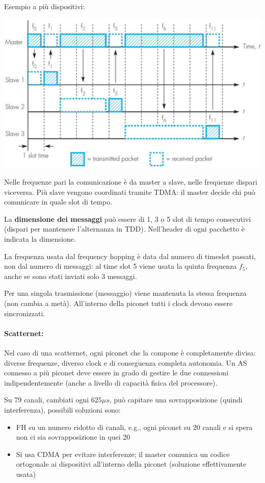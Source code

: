Esempio a più dispositivi: 
\begin{center}
	\includegraphics[width=0.9\linewidth]{img/wpan/picocomm2}
\end{center}

Nelle frequenze pari la comunicazione è da master a slave, nelle frequenze dispari viceversa. Più slave vengono coordinati tramite TDMA: il master decide chi può comunicare in quale slot di tempo. 

La \textbf{dimensione dei messaggi} può essere di 1, 3 o 5 slot di tempo consecutivi (dispari per mantenere l'alternanza in TDD). Nell'header di ogni pacchetto è indicata la dimensione.

La frequenza usata dal frequency hopping è data dal numero di timeslot passati, non dal numero di messaggi: al time slot 5 viene usata la quinta frequenza $f_5$, anche se sono stati inviati solo 3 messaggi. 

Per una singola trasmissione (messaggio) viene mantenuta la stessa frequenza (non cambia a metà). All'interno della piconet tutti i clock devono essere sincronizzati.

\paragraph{Scatternet:} Nel caso di una scatternet, ogni piconet che la compone è completamente divisa: diverse frequenze, diverso clock e di conseguenza completa autonomia. Un AS connesso a più piconet deve essere in grado di gestire le due connessioni indipendentemente (anche a livello di capacità fisica del processore).

Su 79 canali, cambiati ogni $625 \mu s$, può capitare una sovrapposizione (quindi interferenza), possibili soluzioni sono: 
\begin{itemize}
	\item FH su un numero ridotto di canali, e.g., ogni piconet su 20 canali e si spera non ci sia sovrapposizione in quei 20
	
    \item Si usa CDMA per evitare interferenze; il master comunica un codice ortogonale ai dispositivi all'interno della piconet (soluzione effettivamente usata)
\end{itemize}

